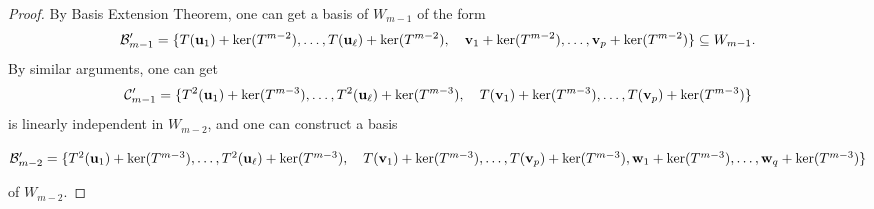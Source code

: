 \begin{proof}
By Basis Extension Theorem, one can get a basis of $W_{m-1}$ of the form
\[
\mathcal{B}_{m-1}' = \{ T({\bf u}_1) + \ker(T^{m-2}), \ldots, T({\bf u}_{\ell}) + \ker(T^{m-2}), \quad {\bf v}_1 + \ker(T^{m-2}), \ldots, {\bf v}_p + \ker(T^{m-2}) \} \subseteq W_{m-1}.
\]
By similar arguments, one can get 
\[
\mathcal{C}_{m-1}' = \{ T^2({\bf u}_1) + \ker(T^{m-3}), \ldots, T^2({\bf u}_{\ell}) + \ker(T^{m-3}), \quad T({\bf v}_1) + \ker(T^{m-3}), \ldots, T({\bf v}_p) + \ker(T^{m-3}) \}
\]
is linearly independent in $W_{m-2}$, and one can construct a basis 
\begin{center}
$\mathcal{B}_{m-2}' = \{ T^2({\bf u}_1) + \ker(T^{m-3}), \ldots, T^2({\bf u}_{\ell}) + \ker(T^{m-3}), \quad T({\bf v}_1) + \ker(T^{m-3}), \ldots, T({\bf v}_p) + \ker(T^{m-3}), 
{\bf w}_1 + \ker(T^{m-3}), \ldots, {\bf w}_q + \ker(T^{m-3})\}$
\end{center}
of $W_{m-2}$.


\end{proof}
